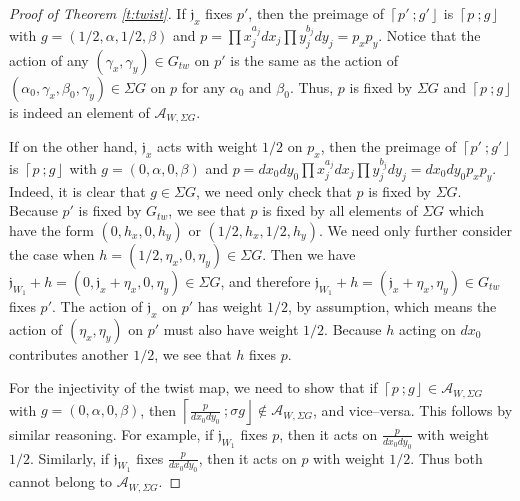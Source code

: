 \documentclass[10pt, letterpaper]{amsart}
\theoremstyle{remark}
\newcommand{\sA}{\mathscr{A}}
\newcommand{\fjrw}[2]{ \left\lceil #1 \:; #2 \right\rfloor }
\newcommand{\jw}{\mathfrak{j}}
\newcommand{\tw}[1]{{#1}_{tw}}
\newcommand{\s}[1]{\Sigma #1}
\begin{document}
\begin{proof}[Proof of Theorem \ref{t:twist}]
If $\jw_x$ fixes $p'$, then the preimage of $\fjrw{p'}{g'}$ is $\fjrw{p}{g}$ with $g=(1/2,\alpha,1/2,\beta)$ and $p=\prod x_j^{a_j}dx_j \prod y_j^{b_j}dy_j = p_x p_y$. Notice that the action of any $(\gamma_x, \gamma_y) \in \tw{G}$ on $p'$ is the same as the action of $(\alpha_0,\gamma_x, \beta_0, \gamma_y)\in \s{G}$ on $p$ for any $\alpha_0$ and $\beta_0$.  Thus, $p$ is fixed by $\s{G}$ and $\fjrw{p}{g}$  is indeed an element of $\sA_{W,\s{G}}$.

If on the other hand, $\jw_x$ acts with weight $1/2$ on $p_x$, then the preimage of $\fjrw{p'}{g'}$ is $\fjrw{p}{g}$ with $g=(0,\alpha,0,\beta)$ and $p=dx_0 dy_0\prod x_j^{a_j}dx_j \prod y_j^{b_j}dy_j=dx_0 dy_0p_xp_y$. Indeed, it is clear that $g\in \s{G}$, we need only check that $p$ is fixed by $\s{G}$. Because $p'$ is fixed by $\tw{G}$, we see that $p$ is fixed by all elements of $\s{G}$ which have the form $(0,h_x,0,h_y)$ or $(1/2,h_x,1/2,h_y)$. We need only further consider the case when $h=(1/2,\eta_x,0,\eta_y)\in \s{G}$. Then we have $\jw_{W_1}+h=(0,\jw_x+\eta_x,0,\eta_y)\in \s{G}$, and therefore $\jw_{W_1}+h=(\jw_x+\eta_x,\eta_y)\in \tw{G}$ fixes $p'$. The action of $\jw_x$ on $p'$ has weight $1/2$, by assumption, which means the action of $(\eta_x, \eta_y)$ on $p'$ must also have weight $1/2$. Because $h$ acting on $dx_0$ contributes another $1/2$, we see that $h$ fixes $p$. 

For the injectivity of the twist map, we need to show that if $\fjrw{p}{g}\in \sA_{W,\s{G}}$ with $g=(0, \alpha, 0, \beta)$, then $\fjrw{\tfrac{p}{dx_0 dy_0}}{\sigma g}\notin \sA_{W,\s{G}}$, and vice--versa. This follows by similar reasoning. For example, if $\jw_{W_1}$ fixes $p$, then it acts on $\tfrac{p}{dx_0 dy_0}$ with weight $1/2$. Similarly, if  $\jw_{W_1}$ fixes $\tfrac{p}{dx_0 dy_0}$, then it acts on $p$ with weight $1/2$. Thus both cannot belong to $\sA_{W,\s{G}}$. 


\end{proof}
\end{document}

